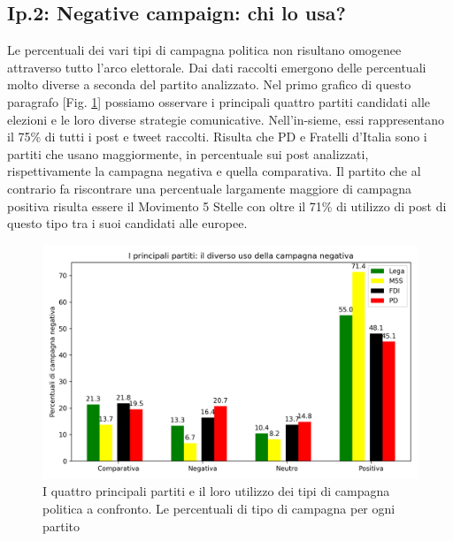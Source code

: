 \subsection{Ip.2: Negative campaign: chi lo usa?}
Le percentuali dei vari tipi di campagna politica non risultano omogenee attraverso tutto l'arco elettorale. Dai dati raccolti emergono delle percentuali molto diverse a seconda del partito analizzato. Nel primo grafico di questo paragrafo  [Fig. \ref{fig:partiti}] possiamo osservare i principali quattro partiti candidati alle elezioni e le loro diverse strategie comunicative. Nell'in-sieme, essi  rappresentano il 75\% di tutti i post e tweet raccolti. Risulta che PD e Fratelli d'Italia sono i partiti che usano maggiormente, in percentuale sui post analizzati, rispettivamente la campagna negativa e quella comparativa. Il partito che al contrario fa riscontrare una percentuale largamente maggiore di campagna positiva risulta essere il Movimento 5 Stelle con oltre il 71\% di utilizzo di post di questo tipo tra i suoi candidati alle europee.
\begin{figure}
	\includegraphics[width=\textwidth]{figures/partiti}
	\caption{I quattro principali partiti e il loro utilizzo dei tipi di campagna politica a confronto. Le percentuali di tipo di campagna per ogni partito}
	\label{fig:partiti}
\end{figure}

